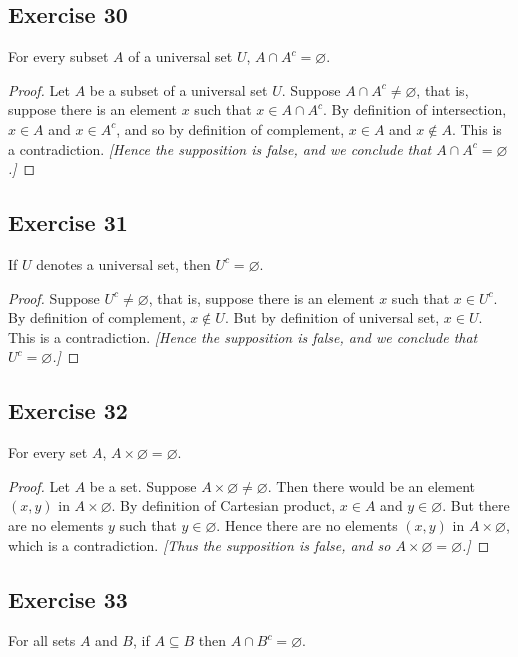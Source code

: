 \documentclass[14pt]{extarticle}
\newcommand{\es}{\varnothing}
\begin{document}
\subsection{Exercise 30}
For every subset $A$ of a universal set $U$, \(A \cap A^c = \es\).

\begin{proof}
  Let $A$ be a subset of a universal set $U$. Suppose \(A \cap A^c \neq \es\), that is, suppose there is an element
  $x$ such that \(x \in A \cap A^c\). By definition of intersection, $x \in A$ and $x \in A^c$, and so by
  definition of complement, $x \in A$ and $x \notin A$. This is a contradiction. {\it [Hence the supposition is false,
        and we conclude that \(A \cap A^c = \es\).]}
\end{proof}

\subsection{Exercise 31}
If $U$ denotes a universal set, then \(U^c = \es\).

\begin{proof}
  Suppose \(U^c \neq \es\), that is, suppose there is an element $x$ such that \(x \in U^c\). By definition of
  complement, $x \notin U$. But by definition of universal set, $x \in U$. This is a contradiction. {\it [Hence the
        supposition is false, and we conclude that \(U^c = \es\).]}
\end{proof}

\subsection{Exercise 32}
For every set $A$, \(A \times \es = \es\).

\begin{proof}
  Let $A$ be a set. Suppose \(A \times \es \neq \es\). Then there would be an element $(x, y)$ in \(A \times \es\). By
  definition of Cartesian product, \(x \in A\) and \(y \in \es\). But there are no elements $y$ such that
  \(y \in \es\). Hence there are no elements \((x, y)\) in \(A \times \es\), which is a contradiction. {\it [Thus the
        supposition is false, and so \(A \times \es = \es\).]}
\end{proof}

\subsection{Exercise 33}
For all sets $A$ and $B$, if \(A \subseteq B\) then \(A \cap B^c = \es\).
\end{document}
